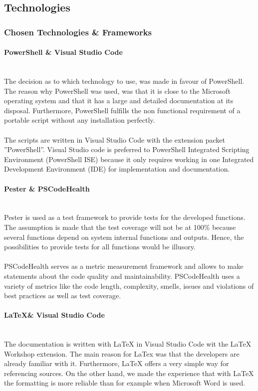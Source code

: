 \clearpage

\subsection{Technologies}
\subsubsection{Chosen Technologies \& Frameworks}
\paragraph{PowerShell \& Visual Studio Code} \ \\
The decision as to which technology to use, was made in favour of PowerShell. The reason why PowerShell was used, was that it is close to the Microsoft operating system and that it has a large and detailed documentation at its disposal. Furthermore, PowerShell fulfills the non functional requirement of a portable script without any installation perfectly.\ \\
\ \\
The scripts are written in Visual Studio Code with the extension packet ''PowerShell''. Visual Studio code is preferred to PowerShell Integrated Scripting Environment (PowerShell ISE) because it only requires working in one Integrated Development Environment (IDE) for implementation and documentation.

\paragraph{Pester \& PSCodeHealth} \ \\
Pester is used as a test framework to provide tests for the developed functions. The assumption is made that the test coverage will not be at 100\% because several functions depend on system internal functions and outputs. Hence, the possibilities to provide tests for all functions would be illusory. 
\\\\
PSCodeHealth serves as a metric measurement framework and allows to make statements about the code quality and maintainability. PSCodeHealth uses a variety of metrics like the code length, complexity, smells, issues and violations of best practices as well as test coverage. 

\paragraph{\LaTeX \& Visual Studio Code}\ \\
The documentation is written with LaTeX in Visual Studio Code wit the LaTeX Workshop extension. The main reason for LaTex was that the developers are already familiar with it. Furthermore, LaTeX offers a very simple way for referencing sources. On the other hand, we made the experience that with LaTeX the formatting is more reliable than for example when Microsoft Word is used.

